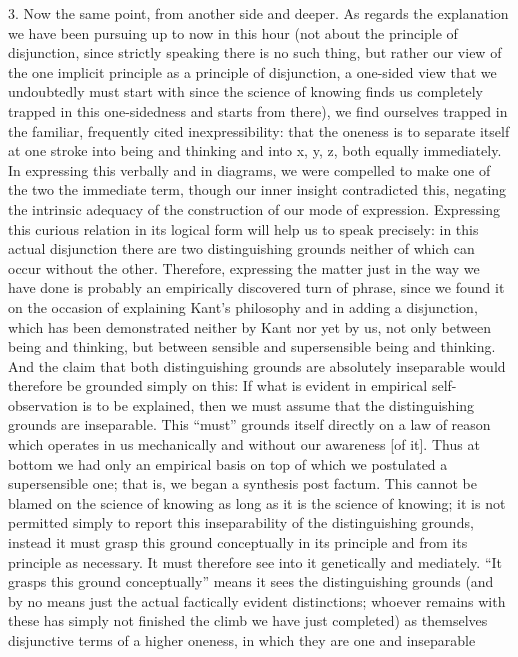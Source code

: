 3. Now the same point, from another side and deeper.
As regards the explanation we have been
pursuing up to now in this hour
(not about the principle of disjunction,
since strictly speaking there is no such thing,
but rather our view of the one implicit principle
as a principle of disjunction,
a one-sided view that we undoubtedly must start with
since the science of knowing finds us completely trapped
in this one-sidedness and starts from there),
we find ourselves trapped in the familiar,
frequently cited inexpressibility:
that the oneness is to separate itself
at one stroke into being and thinking
and into x, y, z, both equally immediately.
In expressing this verbally and in diagrams,
we were compelled to make one of the two the immediate term,
though our inner insight contradicted this,
negating the intrinsic adequacy of
the construction of our mode of expression.
Expressing this curious relation in
its logical form will help us to speak precisely:
in this actual disjunction there are
two distinguishing grounds
neither of which can occur without the other.
Therefore, expressing the matter just in the way
we have done is probably an empirically discovered turn of phrase,
since we found it on the occasion of explaining Kant's philosophy
and in adding a disjunction,
which has been demonstrated
neither by Kant nor yet by us,
not only between being and thinking,
but between sensible and supersensible being and thinking.
And the claim that both distinguishing grounds are
absolutely inseparable would therefore be grounded simply on this:
If what is evident in empirical self-observation is to be explained,
then we must assume that the distinguishing grounds are inseparable.
This “must” grounds itself directly
on a law of reason which operates in us mechanically
and without our awareness [of it].
Thus at bottom we had only an empirical basis
on top of which we postulated a supersensible one;
that is, we began a synthesis post factum.
This cannot be blamed on the science of knowing as
long as it is the science of knowing;
it is not permitted simply to report this
inseparability of the distinguishing grounds,
instead it must grasp this ground conceptually
in its principle and from its principle as necessary.
It must therefore see into it genetically and mediately.
“It grasps this ground conceptually”
means it sees the distinguishing grounds
(and by no means just the actual
factically evident distinctions;
whoever remains with these has simply not
finished the climb we have just completed)
as themselves disjunctive terms of a higher oneness,
in which they are one and inseparable
